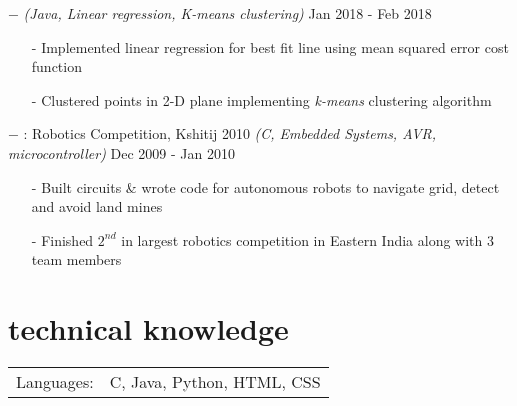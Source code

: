 \documentclass[a4paper, 10pt, oneside]{article}
\newcommand{\bulltetspace}{\vspace{-0.2em}}
\begin{document}
\begin{center}
$-$ \color{headings}{Data Analysis} \textit{(Java, Linear regression, K-means clustering)} \hfill Jan 2018 - Feb 2018
\color{text1}
\vspace{-0.3em}
\begin{itemize}
\bulltetspace
\item[-] Implemented linear regression for best fit line using mean squared error cost function\\
\bulltetspace
\item[-] Clustered points in 2-D plane implementing \textit{k-means} clustering algorithm
\vspace{0.0em}
\end{itemize}


$-$ \color{headings}{Explode} : Robotics Competition, Kshitij 2010 \textit{(C, Embedded Systems, AVR, microcontroller)} \hfill Dec 2009 - Jan 2010
\color{text1}
\vspace{-0.3em}
\begin{itemize}
\bulltetspace
\item[-] Built circuits \& wrote code for autonomous robots to navigate grid, detect and avoid land mines\\
\bulltetspace
\item[-] Finished $2^{nd}$ in largest robotics competition in Eastern India along with 3 team members
\vspace{0.0em}
\end {itemize}


\vspace{-1em}
\section{\color{headings}technical knowledge}
\vspace{-0.5em}
\color{text1}
\raggedright
\begin{tabular}{l l}
Languages: & C, Java, Python, HTML, CSS\\
\end{tabular}


\vspace{-0.5em}

\end{center}
\end{document}

